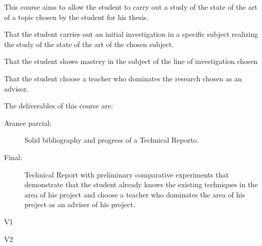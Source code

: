 \begin{syllabus}


\begin{justification}
This course aims to allow the student to carry out a study of the state of the art of a topic chosen by the student for his thesis.
\end{justification}

\begin{goals}
\item That the student carries out an initial investigation in a specific subject realizing the study of the state of the art of the chosen subject.
\item That the student shows mastery in the subject of the line of investigation chosen
\item That the student choose a teacher who dominates the research chosen as an advisor. 
\item The deliverables of this course are:
	\begin{description}
		\item [Avance parcial:] Solid bibliography and progress of a Technical Reporto.
		\item [Final:] Technical Report with preliminary comparative experiments that demonstrate that the student already knows the existing techniques in the area of his project and choose a teacher who dominates the area of his project as an adviser of his project.
	\end{description}
\end{goals}

\begin{outcomes}{V1}
\item {}
\item {}
\item {}
\item {}
\item {}
\item {}
\item {}
\item {}
\end{outcomes}

\begin{outcomes}{V2}
\item {}
\item {}
\item {}
\item {}
\end{outcomes}


\end{syllabus}
